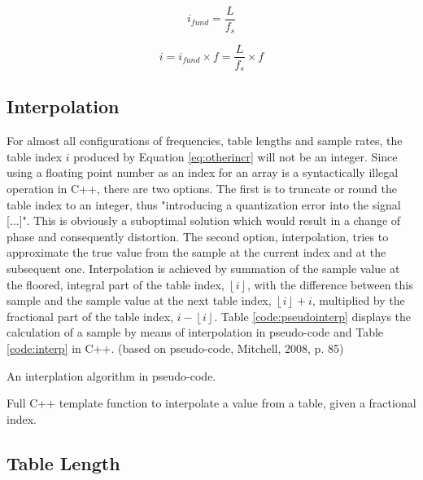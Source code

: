 \documentclass[12pt,twoside]{report}
\begin{document}
\begin{equation}
  i_{fund} = \frac{L}{f_{s}}
  \label{eq:fundincr}
\end{equation}

\begin{equation}
  i = i_{fund} \times f = \frac{L}{f_{s}} \times f
  \label{eq:otherincr}
\end{equation}

\subsection{Interpolation}

For almost all configurations of frequencies, table lengths and sample rates, the table index $i$ produced by Equation \ref{eq:otherincr} will not be an integer. Since using a floating point number as an index for an array is a syntactically illegal operation in C++, there are two options. The first is to truncate or round the table index to an integer, thus "introducing a quantization error into the signal [...]". This is obviously a suboptimal solution which would result in a change of phase and consequently distortion.  The second option, interpolation, tries to approximate the true value from the sample at the current index and at the subsequent one. Interpolation is achieved by summation of the sample value at the floored, integral part of the table index, $\left \lfloor{i}\right \rfloor$, with the difference between this sample and the sample value at the next table index, $\left \lfloor {i}\right \rfloor + i$, multiplied by the fractional part of the table index, $i - \left \lfloor {i}\right \rfloor$. Table \ref{code:pseudointerp} displays the calculation of a sample by means of interpolation in pseudo-code and Table \ref{code:interp} in C++. (based on pseudo-code, Mitchell, 2008, p. 85)

\begin{table}
  \caption{An interplation algorithm in pseudo-code.}
  \label{code:pseudointerp}
\end{table}

\begin{table}
  \caption{Full C++ template function to interpolate a value from a table, given a fractional index. }
  \label{code:interp}
\end{table}

\subsection{Table Length}
\end{document}
